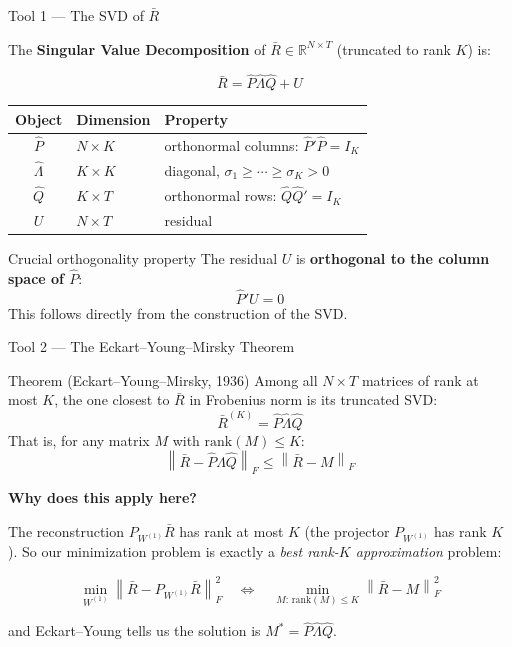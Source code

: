 \documentclass[aspectratio=169, 10pt]{beamer}
\newcommand{\Rbar}{\bar{R}}
\newcommand{\Phat}{\hat{P}}
\newcommand{\Lhat}{\hat{\Lambda}}
\newcommand{\Qhat}{\hat{Q}}
\newcommand{\Wone}{W^{(1)}}
\newcommand{\Pw}{P_{W^{(1)}}}
\newcommand{\norm}[1]{\left\|#1\right\|_F}
\begin{document}
\begin{frame}{Tool 1 — The SVD of $\Rbar$}

The \textbf{Singular Value Decomposition} of $\Rbar \in \mathbb{R}^{N\times T}$ (truncated to rank $K$) is:

$$\Rbar = \Phat\Lhat\Qhat + U$$

\begin{center}
\begin{tabular}{cll}
\toprule
\textbf{Object} & \textbf{Dimension} & \textbf{Property} \\
\midrule
$\Phat$ & $N\times K$ & orthonormal columns: $\Phat{}'\Phat = I_K$ \\
$\Lhat$ & $K\times K$ & diagonal, $\sigma_1\geq\cdots\geq\sigma_K>0$ \\
$\Qhat$ & $K\times T$ & orthonormal rows: $\Qhat\Qhat{}'= I_K$ \\
$U$     & $N\times T$ & residual \\
\bottomrule
\end{tabular}
\end{center}

\bigskip
\begin{alertblock}{Crucial orthogonality property}
The residual $U$ is \textbf{orthogonal to the column space of $\Phat$}:
$$\Phat{}'U = 0$$
This follows directly from the construction of the SVD.
\end{alertblock}

\end{frame}

\begin{frame}{Tool 2 — The Eckart–Young–Mirsky Theorem}

\begin{block}{Theorem (Eckart–Young–Mirsky, 1936)}
Among all $N\times T$ matrices of rank at most $K$, the one closest to $\Rbar$
in Frobenius norm is its truncated SVD:
$$\Rbar^{(K)} = \Phat\Lhat\Qhat$$
That is, for any matrix $M$ with $\mathrm{rank}(M)\leq K$:
$$\norm{\Rbar - \Phat\Lhat\Qhat} \leq \norm{\Rbar - M}$$
\end{block}

\bigskip
\textbf{Why does this apply here?}

The reconstruction $\Pw\Rbar$ has rank at most $K$ (the projector $\Pw$ has rank $K$).
So our minimization problem is exactly a \emph{best rank-$K$ approximation} problem:

$$\min_{\Wone} \norm{\Rbar - \Pw\Rbar}^2 \quad\Longleftrightarrow\quad
  \min_{M:\,\mathrm{rank}(M)\leq K} \norm{\Rbar - M}^2$$

and Eckart–Young tells us the solution is $M^* = \Phat\Lhat\Qhat$.

\end{frame}
\end{document}
